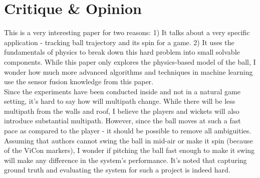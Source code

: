 \documentclass[a4paper]{article}
\begin{document}
\section{Critique \& Opinion}
This is a very interesting paper for two reasons: 1) It talks about a very specific application - tracking ball trajectory and its spin for a game. 2) It uses the fundamentals of physics to break down this hard problem into small solvable components. While this paper only explores the physics-based model of the ball, I wonder how much more advanced algorithms and techniques in machine learning use the sensor fusion knowledge from this paper. \\

Since the experiments have been conducted inside and not in a natural game setting, it's hard to say how will multipath change. While there will be less multipath from the walls and roof, I believe the players and wickets will also introduce substantial multipath. However, since the ball moves at such a fast pace as compared to the player - it should be possible to remove all ambiguities. Assuming that authors cannot swing the ball in mid-air or make it spin (because of the ViCon markers), I wonder if pitching the ball fast enough to make it swing will make any difference in the system's performance. It's noted that capturing ground truth and evaluating the system for such a project is indeed hard.


 






 






 
\end{document}
